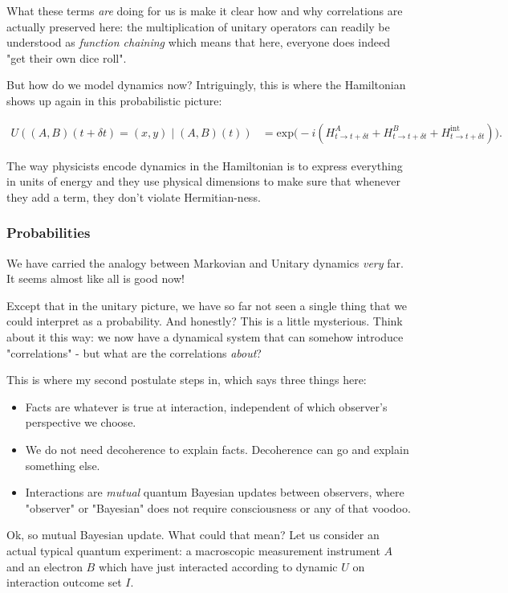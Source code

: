 \documentclass{article}
\begin{document}
What these terms \textit{are} doing for us is make it clear how and why correlations are actually preserved here: the multiplication of unitary operators can readily be understood as \textit{function chaining} which means that here, everyone does indeed "get their own dice roll".

But how do we model dynamics now? Intriguingly, this is where the Hamiltonian shows up again in this probabilistic picture:

\begin{align*}
 U((A,B)(t+\delta t) = (x,y)\mid (A,B)(t)) &= \text{exp}\big (-i( H^A_{t \to t+\delta t} + H^B_{t \to t+\delta t} + H^{\text{int}}_{t \to t+\delta t}) \big ).
 \end{align*}

The way physicists encode dynamics in the Hamiltonian is to express everything in units of energy and they use physical dimensions to make sure that whenever they add a term, they don't violate Hermitian-ness.

\subsubsection{Probabilities}

We have carried the analogy between Markovian and Unitary dynamics \textit{very} far. It seems almost like all is good now!

Except that in the unitary picture, we have so far not seen a single thing that we could interpret as a probability. And honestly? This is a little mysterious. Think about it this way: we now have a dynamical system that can somehow introduce "correlations" - but what are the correlations \textit{about}?

This is where my second postulate steps in, which says three things here:
\begin{itemize}
\item Facts are whatever is true at interaction, independent of which observer's perspective we choose.
\item We do not need decoherence to explain facts. Decoherence can go and explain something else.
\item Interactions are \textit{mutual} quantum Bayesian updates between observers, where "observer" or "Bayesian" does not require consciousness or any of that voodoo.
\end{itemize}

Ok, so mutual Bayesian update. What could that mean? Let us consider an actual typical quantum experiment: a macroscopic measurement instrument $A$ and an electron $B$ which have just interacted according to dynamic $U$ on interaction outcome set $I$.
\end{document}

